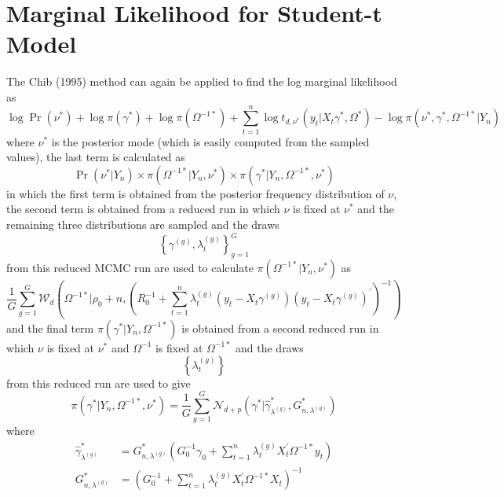 \documentclass[12pt]{article}
\begin{document}
\section{Marginal Likelihood for Student-t Model}

The Chib (1995) method can again be applied to find the log marginal
likelihood as
\begin{equation*}
\log \Pr \left( \nu ^{\ast }\right) +\log \pi \left( \gamma ^{\ast }\right)
+\log \pi \left( \Omega ^{-1\ast }\right) +\sum_{t=1}^{n}\log t_{d,\nu
^{\ast }}\left( y_{t}|X_{t}\gamma ^{\ast },\Omega ^{\ast }\right) -\log \pi
\left( \nu ^{\ast },\gamma ^{\ast },\Omega ^{-1\ast }|Y_{n}\right)
\end{equation*}%
where $\nu ^{\ast }$ is the posterior mode (which is easily computed from
the sampled values), the last term is calculated as%
\begin{equation*}
\Pr \left( \nu ^{\ast }|Y_{n}\right) \times \pi \left( \Omega ^{-1\ast
}|Y_{n},\nu ^{\ast }\right) \times \pi \left( \gamma ^{\ast }|Y_{n},\Omega
^{-1\ast },\nu ^{\ast }\right)
\end{equation*}%
in which the first term is obtained from the posterior frequency
distribution of $\nu $, the second term is obtained from a reduced run in
which $\nu $ is fixed at $\nu ^{\ast }$ and the remaining three
distributions are sampled and the draws
\begin{equation*}
\left\{ \gamma ^{(g)},\lambda _{t}^{(g)}\right\} _{g=1}^{G}
\end{equation*}%
from this reduced MCMC run are used to calculate $\pi \left( \Omega ^{-1\ast
}|Y_{n},\nu ^{\ast }\right) $ as
\begin{equation*}
\frac{1}{G}\sum_{g=1}^{G}\mathcal{W}_{d}\left( \Omega ^{-1\ast }|\rho
_{0}+n,\left( R_{0}^{-1}+\sum_{t=1}^{n}\lambda _{t}^{(g)}\left(
y_{t}-X_{t}\gamma ^{(g)}\right) \left( y_{t}-X_{t}\gamma ^{(g)}\right)
^{\prime }\right) ^{-1}\right)
\end{equation*}%
and the final term $\pi \left( \gamma ^{\ast }|Y_{n},\Omega ^{-1\ast
}\right) $ is obtained from a second reduced run in which $\nu $ is fixed at
$\nu ^{\ast }$ and $\Omega ^{-1}$ is fixed at $\Omega ^{-1\ast }$ and the
draws
\begin{equation*}
\left\{ \lambda _{t}^{(g)}\right\}
\end{equation*}%
from this reduced run are used to give
\begin{equation*}
\pi (\gamma ^{\ast }|Y_{n},\Omega ^{-1\ast },\nu ^{\ast })=\frac{1}{G}%
\sum_{g=1}^{G}\mathcal{N}_{d+p}\left( \gamma ^{\ast }|\hat{\gamma}_{\lambda
^{(g)}}^{\ast },G_{n,\lambda ^{(g)}}^{\ast }\right)
\end{equation*}%
where%
\begin{align*}
\hat{\gamma}_{\lambda ^{(g)}}^{\ast }& =G_{n,\lambda ^{(g)}}^{\ast }\left(
G_{0}^{-1}\gamma _{0}+\sum_{t=1}^{n}\lambda _{t}^{(g)}X_{t}^{\prime }\Omega
^{-1\ast }y_{t}\right)  \\
G_{n,\lambda ^{(g)}}^{\ast }& =\left( G_{0}^{-1}+\sum_{t=1}^{n}\lambda
_{t}^{(g)}X_{t}^{\prime }\Omega ^{-1\ast }X_{t}\right) ^{-1}
\end{align*}
\end{document}
